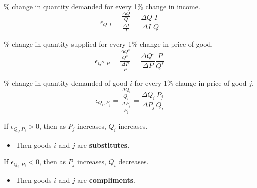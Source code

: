 \documentclass[12pt,t]{beamer}
\begin{document}
\begin{frame}
  
  \bigskip
  \% change in quantity demanded for every 1\% change in income.
  $$
    \epsilon_{Q,I} = \frac{\frac{\Delta Q}{Q}}{\frac{\Delta I}{I}} = \frac{\Delta Q}{\Delta I}\frac{I}{Q}
  $$

  \bigskip
  
  \bigskip
  \% change in quantity supplied for every 1\% change in price of good.
  $$
    \epsilon_{Q^S,P} = \frac{\frac{\Delta Q^s}{Q^s}}{\frac{\Delta P}{P}} = \frac{\Delta Q^s}{\Delta P}\frac{P}{Q^s}
  $$
\end{frame}

\begin{frame}
  
  \bigskip
  \% change in quantity demanded of good $i$ for every 1\% change in price of good $j$.
  $$
    \epsilon_{Q_i,P_j}= \frac{\frac{\Delta Q_i}{Q_i}}{\frac{\Delta P_j}{P_j}}=\frac{\Delta Q_i}{\Delta P_j}\frac{P_j}{Q_i}
  $$
  
  \pause\bigskip
  If $\epsilon_{Q_i,P_j}>0$, then as $P_j$ increases, $Q_i$ increases.
  \begin{itemize}
    \item Then goods $i$ and $j$ are \textbf{substitutes}.
  \end{itemize}
  
  \pause\bigskip
  If $\epsilon_{Q_i,P_j}<0$, then as $P_j$ increases, $Q_i$ decreases.
  \begin{itemize}
    \item Then goods $i$ and $j$ are \textbf{compliments}.
  \end{itemize}
\end{frame}
\end{document}
